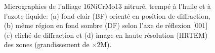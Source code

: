 \begin{figure}[h]
  \centering{}
  
  \caption{\label{fig:tem-aero-micro-shear}Micrographies de l'alliage 16NiCrMo13 nitruré, trempé à l'huile et à l'azote liquide: (a) fond clair (BF) orienté en position de diffraction, (b) même région en fond sombre (DF) selon l'axe de réflexion [001] (c) cliché de diffraction et (d) image en haute résolution (HRTEM) des zones  (grandissement de $\times$2M).}
\end{figure}

